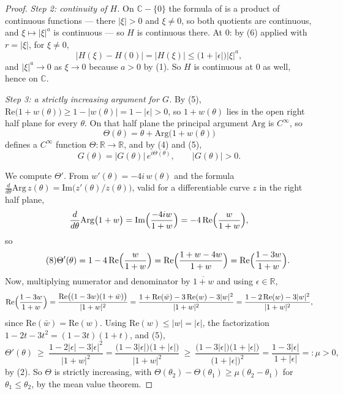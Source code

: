 \begin{proof}
\emph{Step 2: continuity of $H$.}  On $\mathbb{C}-\{0\}$ the formula of
 is a product of continuous functions --- there $|\xi|>0$ and
$\xi\neq0$, so both quotients are continuous, and $\xi\mapsto|\xi|^{a}$ is
continuous --- so $H$ is continuous there.  At $0$: by (6) applied with
$r=|\xi|$, for $\xi\neq0$,
\[
  \bigl|H(\xi)-H(0)\bigr|=\bigl|H(\xi)\bigr|\le\bigl(1+|\epsilon|\bigr)|\xi|^{a},
\]
and $|\xi|^{a}\to0$ as $\xi\to0$ because $a>0$ by (1).  So $H$ is continuous at
$0$ as well, hence on $\mathbb{C}$.

\emph{Step 3: a strictly increasing argument for $G$.}  By (5),
$\mathrm{Re}\bigl(1+w(\theta)\bigr)\ge1-|w(\theta)|=1-|\epsilon|>0$, so
$1+w(\theta)$ lies in the open right half plane for every $\theta$.  On that
half plane the principal argument $\mathrm{Arg}$ is $C^\infty$, so
\[
  \Theta(\theta)=\theta+\mathrm{Arg}\bigl(1+w(\theta)\bigr)
\]
defines a $C^\infty$ function $\Theta\colon\mathbb{R}\to\mathbb{R}$, and by (4)
and (5),
\begin{equation}\tag{7}
  G(\theta)=\bigl|G(\theta)\bigr|\,e^{i\Theta(\theta)},
  \qquad\bigl|G(\theta)\bigr|>0 .
\end{equation}

We compute $\Theta'$.  From $w'(\theta)=-4i\,w(\theta)$ and the formula
$\frac{d}{d\theta}\mathrm{Arg}\,z(\theta)=\mathrm{Im}\bigl(z'(\theta)/z(\theta)\bigr)$,
valid for a differentiable curve $z$ in the right half plane,
\[
  \frac{d}{d\theta}\mathrm{Arg}\bigl(1+w\bigr)
  =\mathrm{Im}\Bigl(\frac{-4iw}{1+w}\Bigr)
  =-4\,\mathrm{Re}\Bigl(\frac{w}{1+w}\Bigr),
\]
so
\begin{equation}\tag{8}
  \Theta'(\theta)=1-4\,\mathrm{Re}\Bigl(\frac{w}{1+w}\Bigr)
  =\mathrm{Re}\Bigl(\frac{1+w-4w}{1+w}\Bigr)
  =\mathrm{Re}\Bigl(\frac{1-3w}{1+w}\Bigr).
\end{equation}
Now, multiplying numerator and denominator by $\overline{1+w}$ and using
$\epsilon\in\mathbb{R}$,
\[
  \mathrm{Re}\Bigl(\frac{1-3w}{1+w}\Bigr)
  =\frac{\mathrm{Re}\bigl((1-3w)(1+\bar w)\bigr)}{|1+w|^2}
  =\frac{1+\mathrm{Re}(\bar w)-3\,\mathrm{Re}(w)-3|w|^2}{|1+w|^2}
  =\frac{1-2\,\mathrm{Re}(w)-3|w|^2}{|1+w|^2},
\]
since $\mathrm{Re}(\bar w)=\mathrm{Re}(w)$.  Using
$\mathrm{Re}(w)\le|w|=|\epsilon|$, the factorization
$1-2t-3t^2=(1-3t)(1+t)$, and (5),
\begin{equation}\tag{9}
  \Theta'(\theta)\ \ge\ \frac{1-2|\epsilon|-3|\epsilon|^2}{|1+w|^2}
  =\frac{\bigl(1-3|\epsilon|\bigr)\bigl(1+|\epsilon|\bigr)}{|1+w|^2}
  \ \ge\ \frac{\bigl(1-3|\epsilon|\bigr)\bigl(1+|\epsilon|\bigr)}{\bigl(1+|\epsilon|\bigr)^2}
  =\frac{1-3|\epsilon|}{1+|\epsilon|}=:\mu>0,
\end{equation}
by (2).  So $\Theta$ is strictly increasing, with $\Theta(\theta_2)-\Theta(\theta_1)\ge\mu(\theta_2-\theta_1)$
for $\theta_1\le\theta_2$, by the mean value theorem.


\end{proof}
